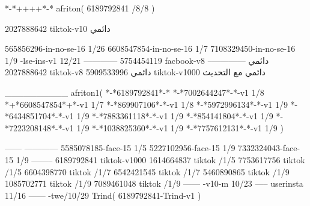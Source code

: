 *-*++++*-*
afriton(
6189792841 /8/8
)

2027888642 tiktok-v10
دائمي

565856296-in-no-se-16 1/26
6608547854-in-no-se-16 1/7
7108329450-in-no-se-16 1/9
-lse-ins-v1 12/21
------------
5754454119 facbook-v8
دائمي
--------------
2027888642 tiktok-v8
دائمي
5909533996 tiktok-v1000
دائمي مع التحديث

__________
afriton1(
*-*6189792841*-*
*-*7002644247*-*-v1 1/8
*+*6608547854*+*-v1 1/7
*-*869907106*-*-v1 1/8
*-*5972996134*-*-v1 1/9
*-*6434851704*-*-v1 1/9
*-*7883361118*-*-v1 1/9
*-*854141804*-*-v1 1/9
*-*7223208148*-*-v1 1/9
*-*1038825360*-*-v1 1/9
*-*7757612131*-*-v1 1/9
)

------
------------
5585078185-face-15 1/5
5227102956-face-15 1/9
7332324043-face-15 1/9
--------
6189792841 tiktok-v1000
1614664837 tiktok /1/5
7753617756 tiktok /1/5
6604398770 tiktok /1/7
6542421545 tiktok /1/7
5460890865 tiktok /1/9
1085702771 tiktok /1/9
7089461048 tiktok /1/9
------
-v10-m 10/23
-----
userinsta 11/16
------
-twe/10/29
Trind(
6189792841-Trind-v1 
)
